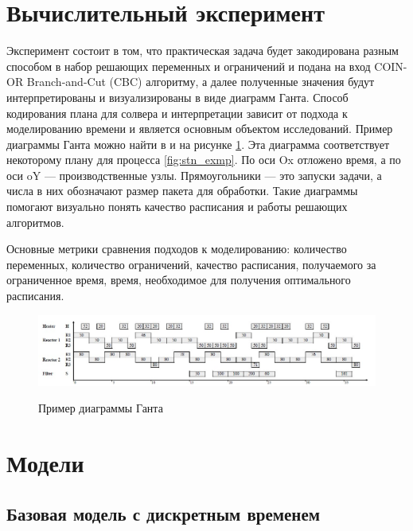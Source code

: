 \documentclass[12pt, twoside]{article}
\theoremstyle{definition}
\begin{document}
\section{Вычислительный эксперимент}

Эксперимент состоит в том, что практическая задача будет закодирована разным способом в набор решающих переменных и ограничений и подана на вход COIN-OR Branch-and-Cut (CBC) алгоритму, а далее полученные значения будут интерпретированы и визуализированы в виде диаграмм Ганта. Способ кодирования плана для солвера и интерпретации зависит от подхода к моделированию времени и является основным объектом исследований. Пример диаграммы Ганта можно найти в \cite{discretetime} и на рисунке \ref{fig:gannt_example}. Эта диаграмма соответствует некоторому плану для процесса \ref{fig:stn_exmp}. По оси Ox отложено время, а по оси oY --- производственные узлы. Прямоугольники --- это запуски задачи, а числа в них обозначают размер пакета для обработки. Такие диаграммы помогают визуально понять качество расписания и работы решающих алгоритмов. 

Основные метрики сравнения подходов к моделированию: количество переменных, количество ограничений, качество расписания, получаемого за ограниченное время, время, необходимое для получения оптимального расписания.

\begin{figure}[h]
\caption{Пример диаграммы Ганта}
\centering
\includegraphics[width=1.0\textwidth]{диаграмма ганта}
\label{fig:gannt_example}
\end{figure}

\section{Модели}
\subsection{Базовая модель с дискретным временем}
\end{document}
